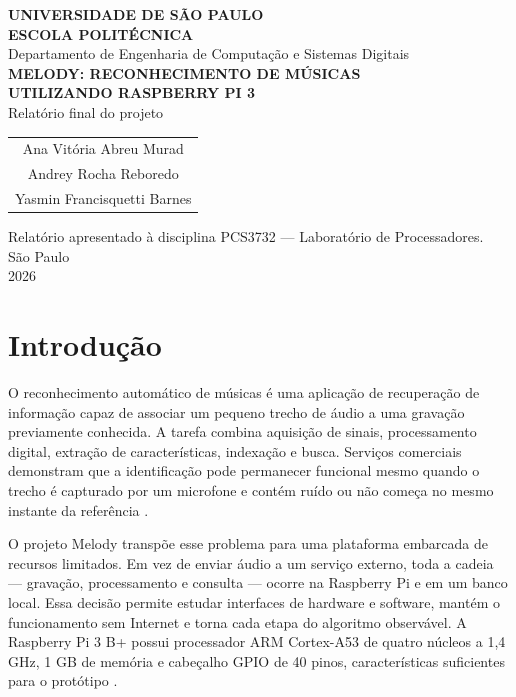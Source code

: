 \documentclass[12pt,a4paper]{article}
\begin{document}
\hypersetup{pageanchor=false}
\begin{titlepage}
    \centering
    \textbf{UNIVERSIDADE DE SÃO PAULO}\\
    \textbf{ESCOLA POLITÉCNICA}\\
    Departamento de Engenharia de Computação e Sistemas Digitais\\[2cm]

    {\Large\textbf{MELODY: RECONHECIMENTO DE MÚSICAS\\
    UTILIZANDO RASPBERRY PI 3}}\\[1.2cm]

    {\large Relatório final do projeto}\\[1.2cm]

    \begin{tabular}{c}
        Ana Vitória Abreu Murad\\
        Andrey Rocha Reboredo\\
        Yasmin Francisquetti Barnes
    \end{tabular}

    \vfill
    Relatório apresentado à disciplina PCS3732 --- Laboratório de Processadores.\\[1.2cm]

    São Paulo\\
    2026
\end{titlepage}
\hypersetup{pageanchor=true}


\tableofcontents
\clearpage
{}

\section{Introdução}

O reconhecimento automático de músicas é uma aplicação de recuperação de
informação capaz de associar um pequeno trecho de áudio a uma gravação previamente
conhecida. A tarefa combina aquisição de sinais, processamento digital, extração
de características, indexação e busca. Serviços comerciais demonstram que a
identificação pode permanecer funcional mesmo quando o trecho é capturado por um
microfone e contém ruído ou não começa no mesmo instante da referência
\cite{wang2003}.

O projeto Melody transpõe esse problema para uma plataforma embarcada de recursos
limitados. Em vez de enviar áudio a um serviço externo, toda a cadeia --- gravação,
processamento e consulta --- ocorre na Raspberry Pi e em um banco local. Essa
decisão permite estudar interfaces de hardware e software, mantém o funcionamento
sem Internet e torna cada etapa do algoritmo observável. A Raspberry Pi 3 B+
possui processador ARM Cortex-A53 de quatro núcleos a 1,4 GHz, 1 GB de memória e
cabeçalho GPIO de 40 pinos, características suficientes para o protótipo
\cite{raspberry2026}.
\end{document}
